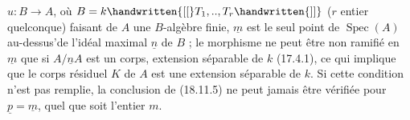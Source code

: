 
$u:B\to A$, où $B=k\handwritten{[[}T_1,..,T_r\handwritten{]]}$ ($r$ entier quelconque) faisant de $A$ une $B$-algèbre finie, $\underline{m}$ est le seul point de $\operatorname{Spec}(A)$ au-dessus'de l'idéal maximal  $\underline{n}$ de $B$ ;  le morphisme   ne peut être non ramifié en $\underline{m}$ que si $A/\underline{n}A$ est un corps, extension séparable de $k$ (17.4.1), ce qui implique que le corps résiduel $K$ de $A$ est une extension séparable de $k$. Si cette condition n'est pas remplie, la conclusion de (18.11.5) ne peut jamais être vérifiée pour $\underline{p}=\underline{m}$, quel que soit l'entier $m$.

